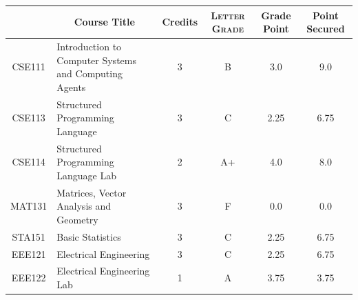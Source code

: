 \documentclass[11pt]{article}
\newcommand*{\numtwo}[1]{\pgfmathprintnumber[
                    fixed, precision=2, fixed zerofill=true]{#1}}
\begin{document}
                \begin{center}
                    \renewcommand{\arraystretch}{1.08}
                    
                \begin{tabular}{|c|l|c|>{\scshape}c|c|c|}
                \hline  \rule[-1ex]{0pt}{3.5ex} {\centering{\bf Course Code}} &  \multicolumn{1}{c|}{\textbf{Course Title}}  & {\bf Credits} & {\bf Letter Grade} & {\bf Grade Point} & {\bf Point Secured}  \\ 
                \hline   CSE111 &  Introduction to Computer Systems and Computing Agents		 & 3 & B & 3.0 & 9.0 \\ %
                \hline   CSE113 &  Structured Programming Language		 & 3 & C & 2.25 & 6.75 \\ %
                \hline   CSE114 &  Structured Programming Language Lab		 & 2 & A+ & 4.0 & 8.0 \\ %
                \hline   MAT131 &  Matrices, Vector Analysis and Geometry		 & 3 & F & 0.0 & 0.0 \\ %
                \hline   STA151 &  Basic Statistics		 & 3 & C & 2.25 & 6.75 \\ %
                \hline   EEE121 &  Electrical Engineering		 & 3 & C & 2.25 & 6.75 \\ %
                \hline   EEE122 &  Electrical Engineering Lab		 & 1 & A & 3.75 & 3.75 \\ %

\hline                %
                \end{tabular}
                \end{center}
                \renewcommand{\arraystretch}{1.03}
\end{document}
